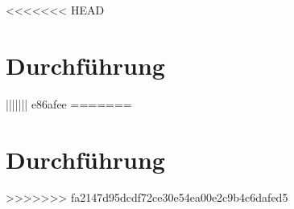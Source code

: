 <<<<<<< HEAD
\section{Durchführung}
\label{sec:Durchführung}



||||||| e86afee
=======
\section{Durchführung}
\label{sec:Durchführung}
>>>>>>> fa2147d95dcdf72ce30e54ea00e2c9b4c6dafed5
